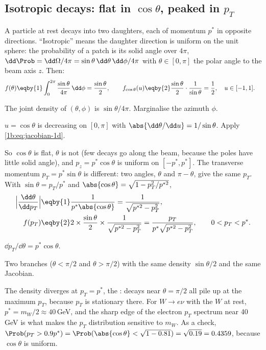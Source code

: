 \subsection{Isotropic decays: flat in \texorpdfstring{$\cos\theta$}{cos theta}, peaked in \texorpdfstring{$p_T$}{pT}}

\label{1b:ex:decay}
A particle at rest decays into two daughters, each of momentum $p^*$ in
opposite directions. ``Isotropic'' means the daughter direction is uniform
on the unit sphere: the probability of a patch is its solid angle over
$4\pi$, $\dd\Prob=\dd\Omega/4\pi=\sin\theta\,\dd\theta\,\dd\phi/4\pi$ with
$\theta\in[0,\pi]$ the polar angle to the beam axis $z$. Then:
\begin{align*}
  f(\theta)
  &\eqby{1} \int_0^{2\pi}\frac{\sin\theta}{4\pi}\,\dd\phi
   = \frac{\sin\theta}{2},\qquad
  f_{\cos\theta}(u)\eqby{2}\frac{\sin\theta}{2}\cdot\frac{1}{\sin\theta}
   = \frac12,\quad u\in[-1,1].
\end{align*}
\begin{explain}
  \item The joint density of $(\theta,\phi)$ is $\sin\theta/4\pi$.
        Marginalise the azimuth $\phi$.
  \item $u=\cos\theta$ is decreasing on $[0,\pi]$ with
        $\abs{\dd\theta/\dd u}=1/\sin\theta$. Apply \eqref{1b:eq:jacobian-1d}.
\end{explain}
So $\cos\theta$ is flat, $\theta$ is not (few decays go along the beam,
because the poles have little solid angle), and $p_z=p^*\cos\theta$ is
uniform on $[-p^*,p^*]$. The transverse momentum $p_T=p^*\sin\theta$ is
different: two angles, $\theta$ and $\pi-\theta$, give the same $p_T$. With
$\sin\theta=p_T/p^*$ and $\abs{\cos\theta}=\sqrt{1-p_T^2/p^{*2}}$,
\begin{align*}
  \Bigl\lvert\frac{\dd\theta}{\dd p_T}\Bigr\rvert
  &\eqby{1} \frac{1}{p^*\abs{\cos\theta}}
   = \frac{1}{\sqrt{p^{*2}-p_T^2}},\\
  f(p_T)
  &\eqby{2} 2\times\frac{\sin\theta}{2}\times\frac{1}{\sqrt{p^{*2}-p_T^2}}
   = \frac{p_T}{p^*\sqrt{p^{*2}-p_T^2}},\qquad 0<p_T<p^* .
\end{align*}
\begin{explain}
  \item $\dd p_T/\dd\theta=p^*\cos\theta$.
  \item Two branches ($\theta<\pi/2$ and $\theta>\pi/2$) with the same
        density $\sin\theta/2$ and the same Jacobian.
\end{explain}
The density diverges at $p_T=p^*$, the : decays near
$\theta=\pi/2$ all pile up at the maximum $p_T$, because $p_T$ is stationary
there. For $W\to e\nu$ with the $W$ at rest, $p^*=m_W/2\approx40\,$GeV, and
the sharp edge of the electron $p_T$ spectrum near 40 GeV is what makes the
$p_T$ distribution sensitive to $m_W$. As a check,
$\Prob(p_T>0.9p^*)=\Prob(\abs{\cos\theta}<\sqrt{1-0.81})=\sqrt{0.19}=0.4359$,
because $\cos\theta$ is uniform.

